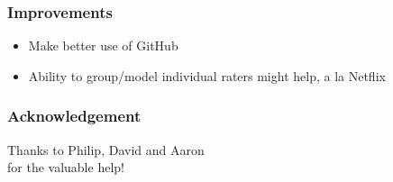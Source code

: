 \documentclass[fleqn]{beamer}
\begin{document}
\begin{frame}
\frametitle{Improvements}
   \begin{itemize}
      \item Make better use of GitHub
      \item Ability to group/model individual raters might help, a la Netflix
   \end{itemize}
\end{frame}

\begin{frame}
\frametitle{Acknowledgement}
\begin{center}
Thanks to Philip, David and Aaron\\
for the valuable help!
\end{center}
   
\end{frame}
\end{document}
